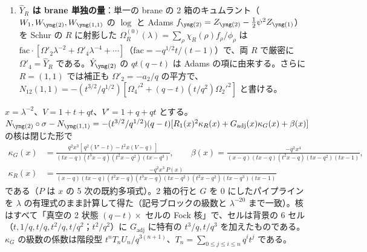 \begin{compresult}[$n = 2$ の行の母関数と $R$ 依存性]
\begin{enumerate}
\item \textbf{$\hat Y_R$ は brane 単独の量}：単一の brane の 2 箱のキュムラント（$W_1, W_{\ytwo}, W_{\yoneone}$ の $\log$ と Adams $f_{\ytwo} = Z_{\ytwo} - \tfrac12\psi^2 Z_{\yone}$）を Schur の $R$ に射影した $\Omega^{(0)}_R(\lambda) = \sum_\rho \chi_R(\rho)f_\rho/\phi_\rho$ は $\mathrm{fac}\cdot[\Omega'_2\lambda^{-2} + \Omega'_4\lambda^{-4} + \cdots]$（$\mathrm{fac} = -q^{1/2}t/(t-1)$）で、両 $R$ で厳密に $\Omega'_4 = \hat Y_R$ である。$\hat Y_{\ytwo}$ の $qt(q-t)$ は Adams の項に由来する。さらに $R = (1,1)$ では補正も $\Omega'_2 = -a_2/q$ の平方で、$N_{12}(1,1) = -(t^{3/2}/q^{1/2})[\Omega_4'^2 + (q-t)(t/q^2)\Omega_2'^2]$ と書ける。
\end{enumerate}
\end{compresult}
\begin{compresult}[随伴のタワーの母関数]\label{cr:tower}
$x = \lambda^{-2}$、$V = 1+t+qt$、$V' = 1+q+qt$ とする。$N_{\ytwo}\circ\sigma - N_{\yoneone} = -(t^{3/2}/q^{1/2})(q-t)[R_1(x)^2\kappa_R(x) + G_{\mathrm{adj}}(x)\kappa_G(x) + \beta(x)]$ の核は閉じた形で
\begin{align*}
\kappa_G(x) &= \frac{q^2x^3[\,q^2(V'-t) - t^2x(V-q)\,]}{(tx-q)(t^3x-q)(t^2x-q^2)(tx-q^3)},\qquad
\beta(x) = \frac{-q^2x^4}{(x-q)(tx-q)(t^2x-q)(tx-q^2)(tx-1)},\\
\kappa_R(x) &= \frac{-q^2x^3\,P(x)}{(x-q)(tx-q)(t^2x-q)(t^3x-q)(tx-q^2)(t^2x-q^2)(tx-q^3)(tx-1)}
\end{align*}
である（$P$ は $x$ の 5 次の既約多項式）。2 箱の行と $G$ を 0 にしたパイプラインを $\lambda$ の有理式のまま計算して得た（記号ブロックの級数と $\lambda^{-20}$ まで一致）。核はすべて「真空の 2 状態 $(q-t)\times$ セルの Fock 核」で、セルは背景の 6 セル（$t, 1/q, t/q, t^2/q, t/q^2$；$t^2/q^2$）に $G_{\mathrm{adj}}$ に特有の $t^3/q, t/q^3$ を加えたものである。$\kappa_G$ の級数の係数は階段型 $t^nT_nU_n/q^{3(n+1)}$、$T_n = \sum_{0\le j\le i\le n}q^it^j$ である。
\end{compresult}
